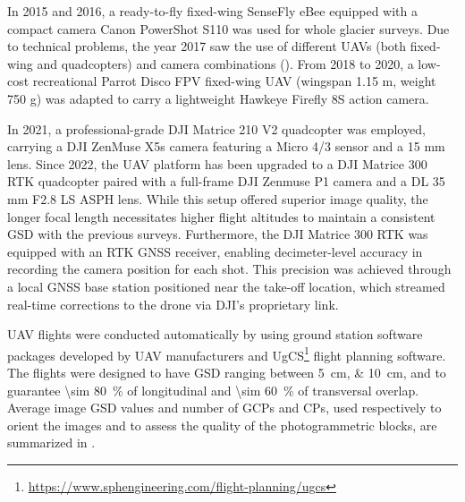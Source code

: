 In 2015 and 2016, a ready-to-fly fixed-wing SenseFly eBee equipped with a compact camera Canon
PowerShot S110 was used for whole glacier surveys.
Due to technical problems, the year 2017 saw the use of different UAVs (both fixed-wing and quadcopters)
and camera combinations (). 
From 2018 to 2020, a low-cost recreational Parrot Disco FPV fixed-wing UAV (wingspan 1.15 m, weight 750 g) 
was adapted to carry a lightweight Hawkeye Firefly 8S action camera.

In 2021, a professional-grade DJI Matrice 210 V2 quadcopter was employed, carrying a 
DJI ZenMuse X5s camera featuring a Micro 4/3 sensor and a 15 mm lens. 
Since 2022, the UAV platform has been upgraded to a DJI Matrice 300 RTK quadcopter
paired with a full-frame DJI Zenmuse P1 camera and a DL 35 mm F2.8 LS ASPH lens.
While this setup offered superior image quality, the longer focal length necessitates 
higher flight altitudes to maintain a consistent GSD with the previous surveys.
Furthermore, the DJI Matrice 300 RTK was equipped with an RTK GNSS receiver, enabling 
decimeter-level accuracy in recording the camera position for each shot. 
This precision was achieved through a local GNSS base station positioned near the take-off 
location, which streamed real-time corrections to the drone via DJI's proprietary link.

UAV flights were conducted automatically by using ground station software packages
developed by UAV manufacturers and UgCS\footnote{\url{https://www.sphengineering.com/flight-planning/ugcs}}
flight planning software.
The flights were designed to have GSD ranging between \qtylist{5;10}{\centi\meter}, and
to guarantee \qty{\sim 80}{\percent} of longitudinal and \qty{\sim 60}{\percent} of
transversal overlap.
Average image GSD values and number of GCPs and CPs, used respectively to orient the
images and to assess the quality of the photogrammetric blocks, are summarized in
.

